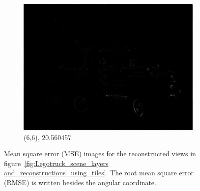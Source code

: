 \documentclass[11pt,a4paper,titlepage]{article}
\begin{document}
\begin{figure}
\begin{subfigure}[t]{0.31\textwidth}
		\includegraphics[width=\textwidth]{results/tiles_legotruck_6x6x480x640_480x640x5_tiling_4x6x200x200_overlap_0.5/MSE_for_view_(6,6).png}
		\caption{(6,6), 20.560457}
	\end{subfigure}%
	
	\caption{Mean square error (MSE) images for the reconstructed views in figure~\ref{fig:Legotruck_scene_layers and_reconstructions_using_tiles}. The root mean square error (RMSE) is written besides the angular coordinate.}
	\label{fig:MSE_for_legotruck_scene_reconstruction_with_tiles}
\end{figure}

\clearpage


\end{document}
